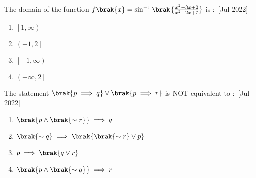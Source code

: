     \item The domain of the function $f\brak{x}=\sin^{-1}\brak{\frac{x^2-3x+2}{x^2+2x+7}}$ is $\colon$
    \hfill{[Jul-2022]}
        \begin{enumerate}
            \item $\left[1,\infty \right)$
            \item $\left(-1,2 \right]$
            \item $\left[-1,\infty \right)$
            \item $\left(-\infty,2 \right]$
        \end{enumerate}
    \item The statement $\brak{p\implies q}\vee \brak{p\implies r}$ is NOT equivalent to $\colon$
    \hfill{[Jul-2022]}
        \begin{enumerate}
            \item $\brak{p\wedge\brak{\sim r}}\implies q$
            \item $\brak{\sim q}\implies\brak{\brak{\sim r}\vee p}$
            \item $p\implies\brak{q\vee r}$
            \item $\brak{p\wedge\brak{\sim q}}\implies r$
        \end{enumerate}
